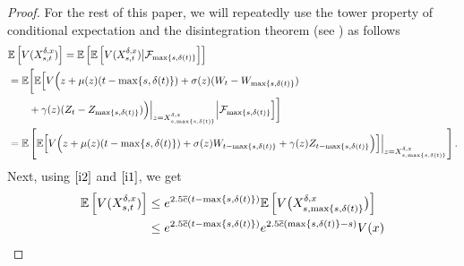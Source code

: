 \documentclass[11pt]{article}
\theoremstyle{theorem}
\theoremstyle{definition}
\newcommand{\1}{{\bf 1}}
\begin{document}
\begin{proof}
For the rest of this paper, we will repeatedly  use the tower property of conditional expectation and the disintegration theorem (see \cite[Lemma 2.2]{HJKNW20}) as follows
\begin{align*}
   &\mathbb{E} \left[ V(X_{s,t}^{\delta,x})\right] =\mathbb{E} \left[\mathbb{E} \left[V(X_{s,t}^{\delta,x})\big| \mathcal{F}_{\max\{s,\delta(t)\}}\right] \right] \notag \\ 
&=\mathbb{E}\biggl[\mathbb{E} \Bigl[V\Bigl(z+
\mu(z)(t- \max\{s,\delta(t)\})+
\sigma(z)(W_{t} -W_{\max\{s,\delta(t)\}} ) \notag \\
&\qquad  +
\gamma (z)(Z_{t} -Z_{ \max\{s,\delta(t)\}} )\Bigr)\Bigr|_{z=X_{s,\max\{s,\delta(t)\}}^{\delta,x} } \Big|\mathcal{F}_{\max\{s,\delta(t)\}}\Bigr]\biggr]\\
&=\mathbb{E}\left[\mathbb{E} \Bigl[V \Bigl(z+
\mu(z)(t- \max\{s,\delta(t)\})+
\sigma(z)W_{t- \max\{s,\delta(t)\}} + \gamma (z)Z_{t- \max\{s,\delta(t)\}}  \Bigr) \Bigr]\Bigr|_{ z=X_{s,\max\{s,\delta(t)\}}^{\delta,x} }\right].
\end{align*}
Next, using $\eqref{i2}$ and $\eqref{i1}$, we get
\begin{align*}
   \mathbb{E} \left[ V(X_{s,t}^{\delta,x})\right] %
&\leq e^{2.5 \overline{c} (t-\max\{s,\delta(t)\})}  \mathbb{E} \left[ V\bigl(X_{s,\max\{s,\delta(t)\}}^{\delta,x} \bigr)\right] \notag \\
& \leq e^{2.5\overline{c} (t-\max\{s,\delta(t)\})}  e^{2.5 \overline{c} (\max\{s,\delta(t)\}-s)}  V(x) \notag \\

\end{align*}
\end{proof}
\end{document}
